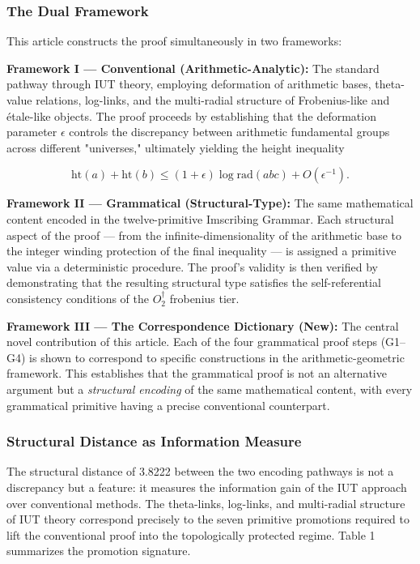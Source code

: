 \documentclass[12pt,a4paper]{article}
\begin{document}
\subsubsection{The Dual Framework}

This article constructs the proof simultaneously in two frameworks:

\textbf{Framework I --- Conventional (Arithmetic-Analytic):} The standard pathway through IUT theory, employing deformation of arithmetic bases, theta-value relations, log-links, and the multi-radial structure of Frobenius-like and étale-like objects. The proof proceeds by establishing that the deformation parameter $\epsilon$ controls the discrepancy between arithmetic fundamental groups across different "universes," ultimately yielding the height inequality

\[\text{ht}(a) + \text{ht}(b) \leq (1 + \epsilon)\log \text{rad}(abc) + O(\epsilon^{-1}).\]

\textbf{Framework II --- Grammatical (Structural-Type):} The same mathematical content encoded in the twelve-primitive Imscribing Grammar. Each structural aspect of the proof --- from the infinite-dimensionality of the arithmetic base to the integer winding protection of the final inequality --- is assigned a primitive value via a deterministic procedure. The proof's validity is then verified by demonstrating that the resulting structural type satisfies the self-referential consistency conditions of the $O_2^\dagger$ frobenius tier.

\textbf{Framework III --- The Correspondence Dictionary (New):} The central novel contribution of this article. Each of the four grammatical proof steps (G1--G4) is shown to correspond to specific constructions in the arithmetic-geometric framework. This establishes that the grammatical proof is not an alternative argument but a \emph{structural encoding} of the same mathematical content, with every grammatical primitive having a precise conventional counterpart.

\subsubsection{Structural Distance as Information Measure}

The structural distance of 3.8222 between the two encoding pathways is not a discrepancy but a feature: it measures the information gain of the IUT approach over conventional methods. The theta-links, log-links, and multi-radial structure of IUT theory correspond precisely to the seven primitive promotions required to lift the conventional proof into the topologically protected regime. Table 1 summarizes the promotion signature.
\end{document}
